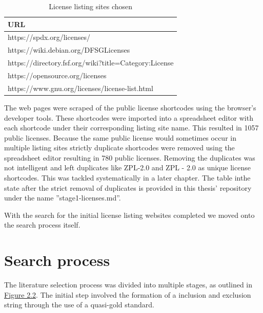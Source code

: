 \begin{table}[t]
	\begin{center}
		\begin{tabular}{||l||}
			\hline
			URL \\
			\hline
      https://spdx.org/licenses/ \\
      https://wiki.debian.org/DFSGLicenses \\
      https://directory.fsf.org/wiki?title=Category:License \\
      https://opensource.org/licenses \\
      https://www.gnu.org/licenses/license-list.html\\
			\hline
		\end{tabular}
		\caption{License listing sites chosen}
		\label{table:listing-sites}
	\end{center}
\end{table}

The web pages were scraped of the public license shortcodes using the browser's developer tools. These shortcodes were imported into a spreadsheet editor with each shortcode under their corresponding listing site name. This resulted in 1057 public licenses. Because the same public license would sometimes occur in multiple listing sites strictly duplicate shortcodes were removed using the spreadsheet editor resulting in 780 public licenses. Removing the duplicates was not intelligent and left duplicates like ZPL-2.0 and ZPL - 2.0 as unique license shortcodes. This was tackled systematically in a later chapter. The table inthe state after the strict removal of duplicates is provided in this thesis' repository \citep{mscthesis} under the name ''stage1-licenses.md''.

With the search for the initial license listing websites completed we moved onto the search process itself.

\section{Search process}
The literature selection process was divided into multiple stages, as outlined in \hyperref[fig:search-process]{Figure 2.2}. The initial step involved the formation of a inclusion and exclusion string through the use of a quasi-gold standard.


